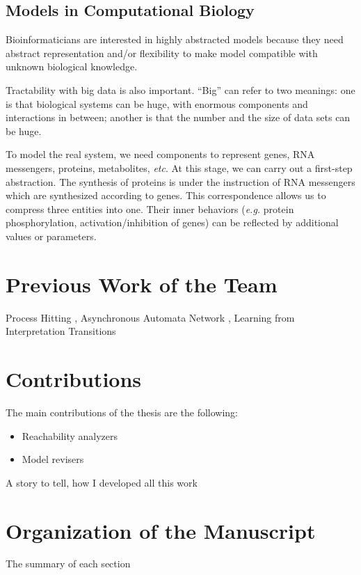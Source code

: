 \subsection{Models in Computational Biology}
Bioinformaticians are interested in highly abstracted models because they need abstract representation and/or flexibility to make model compatible with unknown biological knowledge.

Tractability with big data is also important.
``Big'' can refer to two meanings: one is that biological systems can be huge, with enormous components and interactions in between; another is that the number and the size of data sets can be huge.

To model the real system, we need components to represent genes, RNA messengers, proteins, metabolites, \textit{etc}.
At this stage, we can carry out a first-step abstraction.
The synthesis of proteins is under the instruction of RNA messengers which are synthesized according to genes.
This correspondence allows us to compress three entities into one.
Their inner behaviors (\textit{e.g.} protein phosphorylation, activation/inhibition of genes) can be reflected by additional values or parameters.

\section{Previous Work of the Team}
Process Hitting \cite{pauleve2012}, Asynchronous Automata Network \cite{folschette2015}, Learning from Interpretation Transitions \cite{ribeiro2015learning}

\section{Contributions}
The main contributions of the thesis are the following:
\begin{itemize}
    \item Reachability analyzers
    \item Model revisers
\end{itemize}


A story to tell, how I developed all this work
\section{Organization of the Manuscript}
The summary of each section